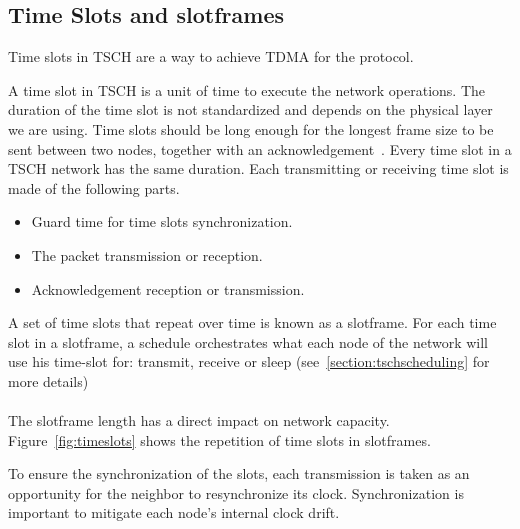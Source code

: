 %


\subsection{Time Slots and slotframes}

Time slots in TSCH are a way to achieve TDMA for the protocol.

A time slot in TSCH is a unit of time to execute the network operations.
The duration of the time slot is not standardized and depends on the physical
layer we are using.
Time slots should be long enough for the longest frame size to be sent
between two nodes, together with an acknowledgement~\cite{rfc7554}.
Every time slot in a TSCH network has the same duration.
Each transmitting or receiving time slot is made of the following parts.

\begin{itemize}
  \item Guard time for time slots synchronization.
  \item The packet transmission or reception.
  \item Acknowledgement reception or transmission.
\end{itemize}

A set of time slots that repeat over time is known as a slotframe.
For each time slot in a slotframe, a schedule orchestrates what each
node of the network will use his time-slot for: transmit, receive or sleep
(see~\ref{section:tschscheduling} for more details)

\paragraph{}

The slotframe length has a direct impact on network capacity.
Figure~\ref{fig:timeslots} shows the repetition of time slots in slotframes.



To ensure the synchronization of the slots, each transmission is taken as an opportunity
for the neighbor to resynchronize its clock.
Synchronization is important to mitigate each node's internal clock drift.

